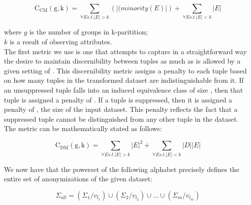 \documentclass[]{seismica}
\begin{document}
    \begin{equation}
        \mathrm{C_{CM}(g,k)} = \sum_{\forall E s.t. \left | E \right | > k}
        (\left | (minority(E) \right |) + \sum_{\forall E s.t. \left | E \right | < k}
        \left | E \right |
    \end{equation}

    where $g$ is the number of groups in k-paritition;\\
    $k$ is a result of observing attributes.\\

The first metric we use is one that attempts to capture in a straightforward way the desire to maintain discernibility between tuples as much as is allowed by a given setting of . This discernibility metric assigns a penalty to each tuple based on how many tuples in the transformed dataset are indistinguishable from it. If an unsuppressed tuple falls into an induced equivalence class of size , then that tuple is assigned a penalty of . If a tuple is suppressed, then it is assigned a penalty of , the size of the input dataset. This penalty reflects the fact that a suppressed tuple cannot be distinguished from any other tuple in the dataset. The metric can be mathematically stated as follows:

    \begin{equation}
        \mathrm{C_{DM}(g,k)} = \sum_{\forall E s.t. \left | E \right | > k}
        \left | E \right |^2 + \sum_{\forall E s.t. \left | E \right | < k}
        \left |D \right | \left | E \right |
    \end{equation}

    We now have that the powerset of the following alphabet precisely defines the entire set of anonymizations of the given dataset:

    \begin{equation}
        \Sigma_{all} = (\Sigma_1 / v_{l_1})
        \cup (\Sigma_2/ v_{l_2})
        \cup ...
        \cup (\Sigma_m / v_{l_m})
    \end{equation}
\end{document}
